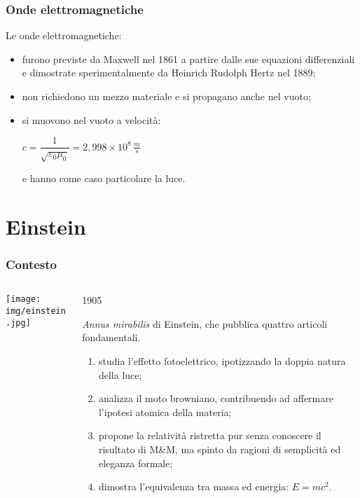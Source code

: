 \documentclass[]{beamer}
\theoremstyle{plain}
\begin{document}
\begin{frame}
  \frametitle{Onde elettromagnetiche}
  Le onde elettromagnetiche:
  \begin{itemize}
    \item furono previste da Maxwell nel 1861 a partire dalle sue equazioni differenziali e dimostrate sperimentalmente da Heinrich Rudolph Hertz nel 1889;\pause
    \item non richiedono un mezzo materiale e si propagano anche nel vuoto;\pause
    \item si muovono nel vuoto a velocità:
    \begin{center}
    $ c = \dfrac{1}{\sqrt{\varepsilon_0 \mu_0}} = 2,998 \times 10^8 \, \frac{m}{s} $
    \end{center}
    e hanno come caso particolare la luce.
  \end{itemize}
\end{frame}



\section{Einstein}

\begin{frame}
\frametitle{Contesto}
\begin{columns}
\begin{column}{0.2\textwidth}
\texttt{[image: img/einstein.jpg]}
\end{column}
\begin{column}{0.7\textwidth}
\begin{center}
  1905
\end{center}
\emph{Annus mirabilis} di Einstein, che pubblica quattro articoli fondamentali.\pause

\begin{small}
\begin{enumerate}
\item<2-> studia l'effetto fotoelettrico, ipotizzando la \alert<2>{doppia natura della luce};
\item<3-> analizza il moto browniano, contribuendo ad affermare l'\alert<3>{ipotesi atomica della materia};
\item<4-> propone la \alert<4>{relatività ristretta} pur senza conoscere il risultato di M\&M, ma spinto da ragioni di semplicità ed eleganza formale;
\item<5-> dimostra l'equivalenza tra massa ed energia: \alert<5>{$ E=mc^2 $}.
\end{enumerate}
\end{small}
\end{column}
\end{columns}
\end{frame}
\end{document}
